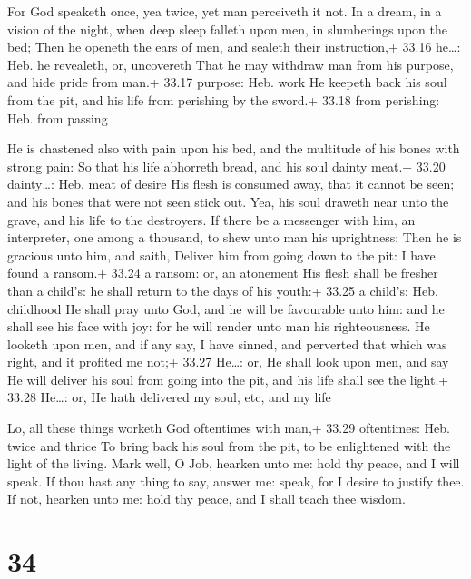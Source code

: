  For God speaketh once, yea twice, yet man perceiveth it
not.  In a dream, in a vision of the night, when deep sleep
falleth upon men, in slumberings upon the bed;  Then he
openeth the ears of men, and sealeth their instruction,+ 33.16 he\ldots:
Heb. he revealeth, or, uncovereth  That he may withdraw man
from his purpose, and hide pride from man.+ 33.17 purpose: Heb. work
 He keepeth back his soul from the pit, and his life from
perishing by the sword.+ 33.18 from perishing: Heb. from passing

 He is chastened also with pain upon his bed, and the
multitude of his bones with strong pain:  So that his life
abhorreth bread, and his soul dainty meat.+ 33.20 dainty\ldots: Heb.
meat of desire  His flesh is consumed away, that it cannot
be seen; and his bones that were not seen stick out.  Yea,
his soul draweth near unto the grave, and his life to the destroyers.
 If there be a messenger with him, an interpreter, one
among a thousand, to shew unto man his uprightness:  Then
he is gracious unto him, and saith, Deliver him from going down to the
pit: I have found a ransom.+ 33.24 a ransom: or, an atonement
 His flesh shall be fresher than a child's: he shall return
to the days of his youth:+ 33.25 a child's: Heb. childhood 
He shall pray unto God, and he will be favourable unto him: and he shall
see his face with joy: for he will render unto man his righteousness.
 He looketh upon men, and if any say, I have sinned, and
perverted that which was right, and it profited me not;+ 33.27 He\ldots:
or, He shall look upon men, and say  He will deliver his
soul from going into the pit, and his life shall see the light.+ 33.28
He\ldots: or, He hath delivered my soul, etc, and my life

 Lo, all these things worketh God oftentimes with man,+
33.29 oftentimes: Heb. twice and thrice  To bring back his
soul from the pit, to be enlightened with the light of the living.
 Mark well, O Job, hearken unto me: hold thy peace, and I
will speak.  If thou hast any thing to say, answer me:
speak, for I desire to justify thee.  If not, hearken unto
me: hold thy peace, and I shall teach thee wisdom.

\hypertarget{section-33}{%
\section{34}\label{section-33}}

